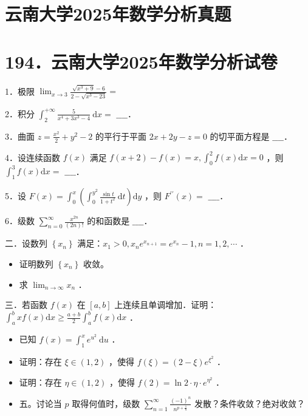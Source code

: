 \documentclass{article}
\begin{document}
\section*{云南大学2025年数学分析真题}
\section*{194．云南大学2025年数学分析试卷}

1．极限 \(\lim _{x \rightarrow 3} \frac{\sqrt{x^{3}+9}-6}{2-\sqrt{x^{3}-23}}=\)

2．积分 \(\int_{2}^{+\infty} \frac{5}{x^{4}+3 x^{3}-4} \mathrm{~d} x=\) \(\_\_\_\_\)．

3．曲面 \(z=\frac{x^{2}}{2}+y^{2}-2\) 的平行于平面 \(2 x+2 y-z=0\) 的切平面方程是 \(\_\_\_\_\)．

4．设连续函数 \(f(x)\) 满足 \(f(x+2)-f(x)=x, \int_{0}^{2} f(x) \mathrm{d} x=0\) ，则 \(\int_{1}^{3} f(x) \mathrm{d} x=\) \(\_\_\_\_\)．

5．设 \(F(x)=\int_{0}^{x}\left(\int_{0}^{y^{2}} \frac{\sin t}{1+t^{2}} \mathrm{~d} t\right) \mathrm{d} y\) ，则 \(F^{\prime \prime}(x)=\) \(\_\_\_\_\)．

6．级数 \(\sum_{n=0}^{\infty} \frac{x^{2 n}}{(2 n)!}\) 的和函数是 \(\_\_\_\_\)．

二．设数列 \(\left\{x_{n}\right\}\) 满足：\(x_{1}>0, x_{n} e^{x_{n+1}}=e^{x_{n}}-1, n=1,2, \cdots\) ．

\begin{itemize}
  \item[（1）] 证明数列 \(\left\{x_{n}\right\}\) 收敛。
  \item[（2）] 求 \(\lim _{n \rightarrow \infty} x_{n}\) ．
\end{itemize}

三．若函数 \(f(x)\) 在 \([a, b]\) 上连续且单调增加．证明： \(\int_{a}^{b} x f(x) \mathrm{d} x \geq \frac{a+b}{2} \int_{a}^{b} f(x) \mathrm{d} x\) ．

\begin{itemize}
  \item[四．] 已知 \(f(x)=\int_{1}^{x} e^{u^{2}} \mathrm{~d} u\) ．

  \item[1．] 证明：存在 \(\xi \in(1,2)\) ，使得 \(f(\xi)=(2-\xi) e^{\xi^{2}}\) ．

  \item[2．] 证明：存在 \(\eta \in(1,2)\) ，使得 \(f(2)=\ln 2 \cdot \eta \cdot e^{\eta^{2}}\) ．
  \item[] 五。讨论当 \(p\) 取得何值时，级数 \(\sum_{n=1}^{\infty} \frac{(-1)^{n}}{n^{p+\frac{1}{n}}}\) 发散？条件收敛？绝对收敛？
\end{itemize}
\end{document}
